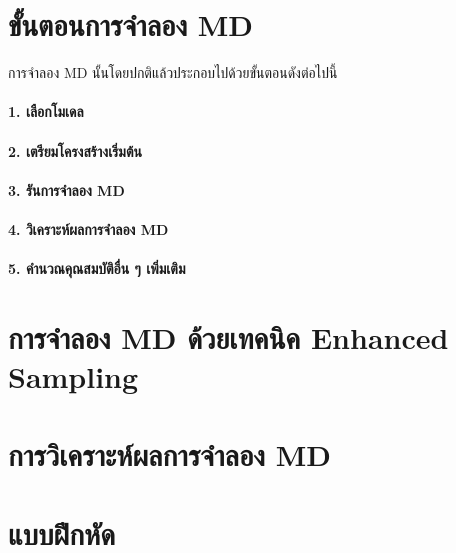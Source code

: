 \section{ขั้นตอนการจำลอง MD}

การจำลอง MD นั้นโดยปกติแล้วประกอบไปด้วยขั้นตอนดังต่อไปนี้

\paragraph{1. เลือกโมเดล}

\paragraph{2. เตรียมโครงสร้างเริ่มต้น}

\paragraph{3. รันการจำลอง MD}

\paragraph{4. วิเคราะห์ผลการจำลอง MD}

\paragraph{5. คำนวณคุณสมบัติอื่น ๆ เพิ่มเติม}

\section{การจำลอง MD ด้วยเทคนิค Enhanced Sampling}

\section{การวิเคราะห์ผลการจำลอง MD}

\section{แบบฝึกหัด}
